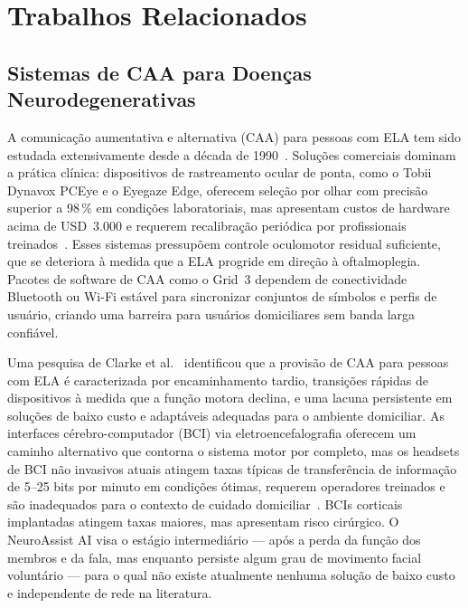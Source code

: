 
\section{Trabalhos Relacionados}
\label{sec:relacionados}

\subsection{Sistemas de CAA para Doenças Neurodegenerativas}

A comunicação aumentativa e alternativa (CAA) para pessoas com ELA tem sido
estudada extensivamente desde a década de 1990~\cite{beukelman2013aac}. Soluções
comerciais dominam a prática clínica: dispositivos de rastreamento ocular de ponta,
como o Tobii Dynavox PCEye e o Eyegaze Edge, oferecem seleção por olhar com precisão
superior a 98\,\% em condições laboratoriais, mas apresentam custos de hardware acima
de USD~3.000 e requerem recalibração periódica por profissionais treinados~\cite{beukelman2013aac}.
Esses sistemas pressupõem controle oculomotor residual suficiente, que se deteriora
à medida que a ELA progride em direção à oftalmoplegia. Pacotes de software de CAA
como o Grid~3 dependem de conectividade Bluetooth ou Wi-Fi estável para sincronizar
conjuntos de símbolos e perfis de usuário, criando uma barreira para usuários
domiciliares sem banda larga confiável.

Uma pesquisa de Clarke et al.~\cite{clarke2021aac} identificou que a provisão de CAA
para pessoas com ELA é caracterizada por encaminhamento tardio, transições rápidas de
dispositivos à medida que a função motora declina, e uma lacuna persistente em soluções
de baixo custo e adaptáveis adequadas para o ambiente domiciliar. As interfaces
cérebro-computador (BCI) via eletroencefalografia oferecem um caminho alternativo que
contorna o sistema motor por completo, mas os headsets de BCI não invasivos atuais
atingem taxas típicas de transferência de informação de 5--25 bits por minuto em
condições ótimas, requerem operadores treinados e são inadequados para o contexto de
cuidado domiciliar~\cite{zander2011passive}. BCIs corticais implantadas atingem taxas
maiores, mas apresentam risco cirúrgico. O NeuroAssist AI visa o estágio intermediário
— após a perda da função dos membros e da fala, mas enquanto persiste algum grau de
movimento facial voluntário — para o qual não existe atualmente nenhuma solução de
baixo custo e independente de rede na literatura.

